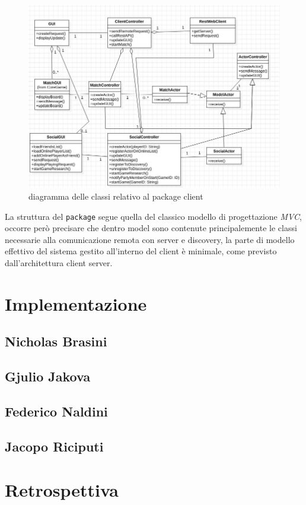   \begin{figure}
    \includegraphics[width=\textwidth,height=\textheight,keepaspectratio]{clientArchitecture}
     \caption{diagramma delle classi relativo al package client}
  \end{figure}

  La struttura del \texttt{package} segue quella del classico modello di progettazione \textit{MVC}, occorre però precisare che dentro model sono contenute principalemente le classi necessarie alla comunicazione remota con server e discovery, la parte di modello effettivo del sistema gestito all'interno del client è minimale, come previsto dall'architettura client server.











    \clearpage

    \section{Implementazione}\label{sec:implementation}
        \subsection{Nicholas Brasini}\label{subsec:brasini}
        \subsection{Gjulio Jakova}\label{subsec:jakova}
        \subsection{Federico Naldini}\label{subsec:naldini}
        \subsection{Jacopo Riciputi}\label{subsec:riciputi}

        \clearpage

    \section{Retrospettiva}\label{sec:retrospective}


